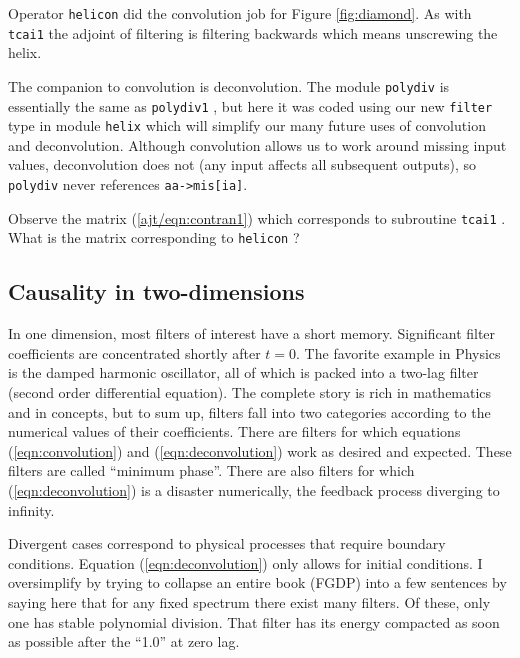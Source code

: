 \par
Operator {\tt helicon} did the convolution job for Figure \ref{fig:diamond}.
As with
\texttt{tcai1} 
the adjoint of filtering is filtering backwards
which means unscrewing the helix.

\par
The companion to convolution is deconvolution.
The module \texttt{polydiv} 
is essentially the same as
\texttt{polydiv1} ,
but here it was coded using
our new \texttt{filter} type in
module \texttt{helix} 
which will simplify our many future uses of
convolution and deconvolution.
Although convolution allows us to work around missing input values,
deconvolution does not
(any input affects all subsequent outputs),
so \texttt{polydiv} never references \verb#aa->mis[ia]#.

\begin{exer}
\item
Observe the matrix (\ref{ajt/eqn:contran1})
which corresponds to
subroutine
\texttt{tcai1} .
What is the matrix corresponding to
\texttt{helicon} ?
\end{exer}

\subsection{Causality in two-dimensions}
In one dimension, most filters of interest have a short memory.
Significant filter coefficients are concentrated shortly after $t=0$.
The favorite example in Physics is the
damped harmonic oscillator,
all of which is packed into a two-lag filter
(second order differential equation).
The complete story is rich in mathematics and in concepts,
but to sum up, filters fall into two categories according to the
numerical values of their coefficients.
There are filters for which equations
(\ref{eqn:convolution}) and
(\ref{eqn:deconvolution})
work as desired and expected.
These filters are called ``minimum phase''.
There are also filters for which
(\ref{eqn:deconvolution}) is a disaster numerically,
the feedback process diverging to infinity.

\par
Divergent cases correspond to physical processes
that require boundary conditions.
Equation (\ref{eqn:deconvolution})
only allows for initial conditions.
I oversimplify by trying to collapse an entire book (FGDP)
into a few sentences by saying here that
for any fixed spectrum
there exist many filters.
Of these, only one has
stable polynomial division.
That filter has its energy compacted
as soon as possible after the ``1.0'' at zero lag.

